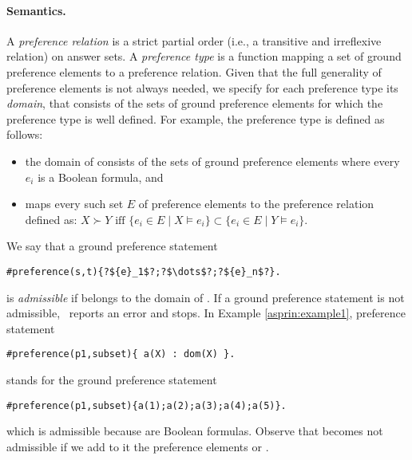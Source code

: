 \paragraph{Semantics.}
A \emph{preference relation} is a strict partial order (i.e., a transitive and irreflexive relation) on answer sets.
A \emph{preference type}  is a function mapping a set of ground preference elements
 to a preference relation.
Given that the full generality of preference elements is not always needed,
we specify for each preference type its \emph{domain}, 
that consists of the sets of ground preference elements for which the preference type is well defined.
For example, the preference type  is defined as follows: 
\begin{itemize}
\item
the domain of 
consists of the  
sets of ground preference elements 
where every $e_i$ is a Boolean formula, and 
\item
 maps every such set $E$ of preference elements to the preference relation defined as: 
\(
X \succ Y \text{ iff } \{e_i\in E\mid X\models e_i\}\subset\{e_i\in E\mid Y\models e_i\}
\).
\end{itemize}

We say that a ground preference statement
\begin{lstlisting}[numbers=none,escapechar=?]
#preference(s,t){?${e}_1$?;?$\dots$?;?${e}_n$?}.
\end{lstlisting}
is \emph{admissible} if  belongs to the domain of .
If a ground preference statement is not admissible, \asprin\ reports an error and stops. 
In Example \ref{asprin:example1}, preference statement  
\begin{lstlisting}[numbers=none]
#preference(p1,subset){ a(X) : dom(X) }.
\end{lstlisting}
stands for the ground preference statement 
\begin{lstlisting}[numbers=none]
#preference(p1,subset){a(1);a(2);a(3);a(4);a(5)}.
\end{lstlisting}
which is admissible because  are Boolean formulas. 
Observe that  becomes not admissible if we add to it the preference elements  or .

